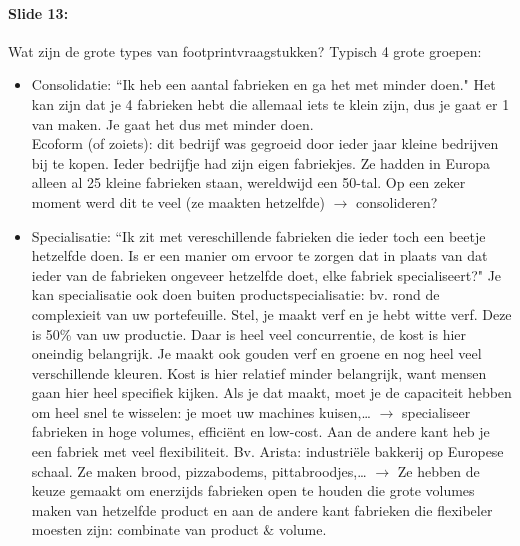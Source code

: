 \documentclass[10pt,a4paper]{report}
\begin{document}
\paragraph{Slide 13:} Wat zijn de grote types van footprintvraagstukken? Typisch 4 grote groepen:
\begin{itemize}
\item Consolidatie: ``Ik heb een aantal fabrieken en ga het met minder doen." Het kan zijn dat je 4 fabrieken hebt die allemaal iets te klein zijn, dus je gaat er 1 van maken. Je gaat het dus met minder doen.\\
Ecoform (of zoiets): dit bedrijf was gegroeid door ieder jaar kleine bedrijven bij te kopen. Ieder bedrijfje had zijn eigen fabriekjes. Ze hadden in Europa alleen al 25 kleine fabrieken staan, wereldwijd een 50-tal. Op een zeker moment werd dit te veel (ze maakten hetzelfde) $\rightarrow$ consolideren? 
\item Specialisatie: ``Ik zit met vereschillende fabrieken die ieder toch een beetje hetzelfde doen. Is er een manier om ervoor te zorgen dat in plaats van dat ieder van de fabrieken ongeveer hetzelfde doet, elke fabriek specialiseert?" Je kan specialisatie ook doen buiten productspecialisatie: bv. rond de complexieit van uw portefeuille. Stel, je maakt verf en je hebt witte verf. Deze is 50\% van uw productie. Daar is heel veel concurrentie, de kost is hier oneindig belangrijk. Je maakt ook gouden verf en groene en nog heel veel verschillende kleuren. Kost is hier relatief minder belangrijk, want mensen gaan hier heel specifiek kijken. Als je dat maakt, moet je de capaciteit hebben om heel snel te wisselen: je moet uw machines kuisen,… $\rightarrow$ specialiseer fabrieken in hoge volumes, effici\"ent en low-cost. Aan de andere kant heb je een fabriek met veel flexibiliteit. Bv. Arista: industri\"ele bakkerij op Europese schaal. Ze maken brood, pizzabodems, pittabroodjes,… $\rightarrow$ Ze hebben de keuze gemaakt om enerzijds fabrieken open te houden die grote volumes maken van hetzelfde product en aan de andere kant fabrieken die flexibeler moesten zijn: combinate van product $\&$ volume.

\end{itemize}
\end{document}
